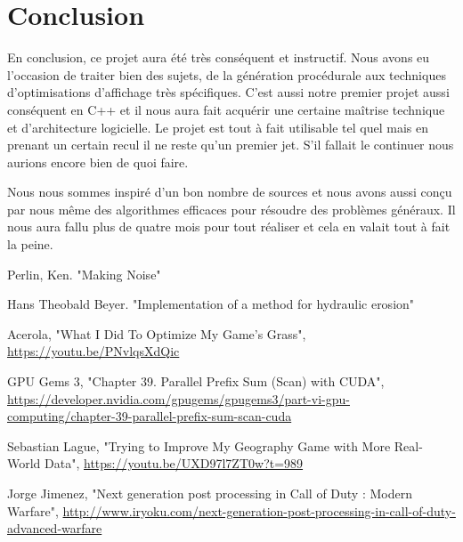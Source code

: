 \documentclass{EPUProjetDi}
\begin{document}
\chapter*{Conclusion}

En conclusion, ce projet aura été très conséquent et instructif. Nous avons eu l'occasion de traiter bien des sujets, de la génération procédurale aux techniques d'optimisations d'affichage  très spécifiques. C'est aussi notre premier projet aussi conséquent en C++ et il nous aura fait acquérir une certaine maîtrise technique et d'architecture logicielle. Le projet est tout à fait utilisable tel quel mais en prenant un certain recul il ne reste qu'un premier jet. S'il fallait le continuer nous aurions encore bien de quoi faire.

Nous nous sommes inspiré d'un bon nombre de sources et nous avons aussi conçu par nous même des algorithmes efficaces pour résoudre des problèmes généraux. Il nous aura fallu plus de quatre mois pour tout réaliser et cela en valait tout à fait la peine.




\begin{thebibliography}{9}
Perlin, Ken. "Making Noise"

Hans Theobald Beyer. "Implementation of a method for hydraulic erosion"

Acerola, "What I Did To Optimize My Game's Grass", \url{https://youtu.be/PNvlqsXdQic}

GPU Gems 3, "Chapter 39. Parallel Prefix Sum (Scan) with CUDA", \url{https://developer.nvidia.com/gpugems/gpugems3/part-vi-gpu-computing/chapter-39-parallel-prefix-sum-scan-cuda}

Sebastian Lague, "Trying to Improve My Geography Game with More Real-World Data", \url{https://youtu.be/UXD97l7ZT0w?t=989}


Jorge Jimenez, "Next generation post processing in Call of Duty : Modern Warfare", \url{http://www.iryoku.com/next-generation-post-processing-in-call-of-duty-advanced-warfare}



\end{thebibliography}
\end{document}
